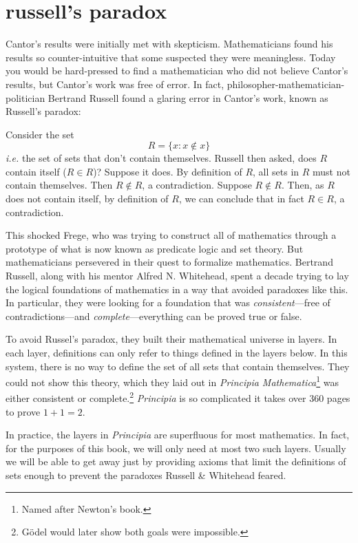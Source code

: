 \documentclass{scrbook}
\newcommand{\ie}{\emph{i.e.}\xspace}
\begin{document}
\section[Russell's paradox]{russell's paradox}
Cantor's results were initially met with skepticism. Mathematicians found his results so counter-intuitive that some suspected they were meaningless. Today you would be hard-pressed to find a mathematician who did not believe Cantor's results, but Cantor's work was free of error. In fact, philosopher-mathematician-politician Bertrand Russell found a glaring error in Cantor's work, known as Russell's paradox: 

Consider the set
\[
R= \{x: x\notin x\}
\]
\ie the set of sets that don't contain themselves. Russell then asked, does $R$ contain itself ($R\in R$)? Suppose it does. By definition of $R$, all sets in $R$ must not contain themselves. Then $R\notin R$, a contradiction. Suppose $R\notin R$. Then, as $R$ does not contain itself, by definition of $R$, we can conclude that in fact $R\in R$, a contradiction. 

This shocked Frege, who was trying to construct all of mathematics through a prototype of what is now known as predicate logic and set theory. But mathematicians persevered in their quest to formalize mathematics. Bertrand Russell, along with his mentor Alfred N. Whitehead, spent a decade trying to lay the logical foundations of mathematics in a way that avoided paradoxes like this. In particular, they were looking for a foundation that was \emph{consistent}---free of contradictions---and \emph{complete}---everything can be proved true or false. 

To avoid Russel's paradox, they built their mathematical universe in layers. In each layer, definitions can only refer to things defined in the layers below. In this system, there is no way to define the set of all sets that contain themselves. They could not show this theory, which they laid out in \emph{Principia Mathematica}\footnote{Named after Newton's book.} was either consistent or complete.\footnote{Gödel would later show both goals were impossible.} \emph{Principia} is so complicated it takes over 360 pages to prove $1+1=2$\cite{principia}. 

In practice, the layers in \emph{Principia} are superfluous for most mathematics. In fact, for the purposes of this book, we will only need at most two such layers. Usually we will be able to get away just by providing axioms that limit the definitions of sets enough to prevent the paradoxes Russell \& Whitehead feared. 
\end{document}
